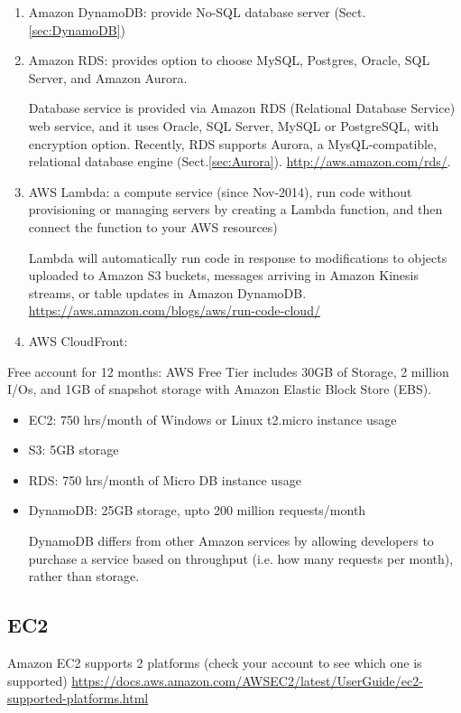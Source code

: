 \begin{enumerate}
  \item Amazon DynamoDB: provide No-SQL database server
  (Sect.\ref{sec:DynamoDB})
  
  \item Amazon RDS: provides option to choose MySQL, Postgres, Oracle, SQL
  Server, and Amazon Aurora.

Database service is provided via Amazon RDS (Relational Database Service) web
service, and it uses Oracle, SQL Server, MySQL or PostgreSQL, with encryption
option. Recently, RDS supports Aurora, a MysQL-compatible, relational database
engine (Sect.\ref{sec:Aurora}).
\url{http://aws.amazon.com/rds/}.

  \item AWS Lambda: a compute service (since Nov-2014), run code without
  provisioning or managing servers by creating a Lambda function, and then
  connect the function to your AWS resources)
  
  Lambda will automatically run code in response to modifications to objects
  uploaded to Amazon S3 buckets, messages arriving in
  Amazon Kinesis streams, or table updates in Amazon DynamoDB.
  \url{https://aws.amazon.com/blogs/aws/run-code-cloud/}
  
  \item AWS CloudFront: 
  
  
\end{enumerate}

Free account for 12 months: AWS Free Tier includes 30GB of Storage, 2 million
I/Os, and 1GB of snapshot storage with Amazon Elastic Block Store (EBS).
\begin{itemize}
  \item EC2: 750 hrs/month of Windows or Linux t2.micro instance usage
  \item S3: 5GB storage
  \item RDS: 750 hrs/month of Micro DB instance usage
  \item DynamoDB: 25GB storage, upto 200 million requests/month
  
  DynamoDB differs from other Amazon services by allowing developers to purchase
  a service based on throughput (i.e. how many requests per month), rather than
  storage.
\end{itemize}

\subsection{EC2}


Amazon EC2 supports 2 platforms (check your account to see which one is
supported)
\url{https://docs.aws.amazon.com/AWSEC2/latest/UserGuide/ec2-supported-platforms.html}


